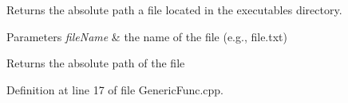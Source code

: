 Returns the absolute path a file located in the executable\textquotesingle{}s directory. 
\begin{DoxyParams}{Parameters}
{\em file\+Name} & the name of the file (e.\+g., file.\+txt) \\
\hline
\end{DoxyParams}
\begin{DoxyReturn}{Returns}
the absolute path of the file 
\end{DoxyReturn}


Definition at line 17 of file Generic\+Func.\+cpp.

